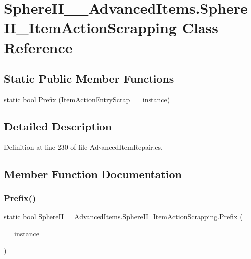 \hypertarget{class_sphere_i_i_____advanced_items_1_1_sphere_i_i___item_action_scrapping}{}\section{Sphere\+I\+I\+\_\+\+\_\+\+Advanced\+Items.\+Sphere\+I\+I\+\_\+\+Item\+Action\+Scrapping Class Reference}
\label{class_sphere_i_i_____advanced_items_1_1_sphere_i_i___item_action_scrapping}
\subsection*{Static Public Member Functions}
\begin{DoxyCompactItemize}
\item 
static bool \mbox{\hyperlink{class_sphere_i_i_____advanced_items_1_1_sphere_i_i___item_action_scrapping_af6c93818551d78cd85df489a4aae5da5}{Prefix}} (Item\+Action\+Entry\+Scrap \+\_\+\+\_\+instance)
\end{DoxyCompactItemize}


\subsection{Detailed Description}


Definition at line 230 of file Advanced\+Item\+Repair.\+cs.



\subsection{Member Function Documentation}
\mbox{\label{class_sphere_i_i_____advanced_items_1_1_sphere_i_i___item_action_scrapping_af6c93818551d78cd85df489a4aae5da5}} 
\subsubsection{\texorpdfstring{Prefix()}{Prefix()}}
{\footnotesize\ttfamily static bool Sphere\+I\+I\+\_\+\+\_\+\+Advanced\+Items.\+Sphere\+I\+I\+\_\+\+Item\+Action\+Scrapping.\+Prefix (\begin{DoxyParamCaption}\item[{Item\+Action\+Entry\+Scrap}]{\+\_\+\+\_\+instance }\end{DoxyParamCaption})\hspace{0.3cm}{\ttfamily [static]}}



